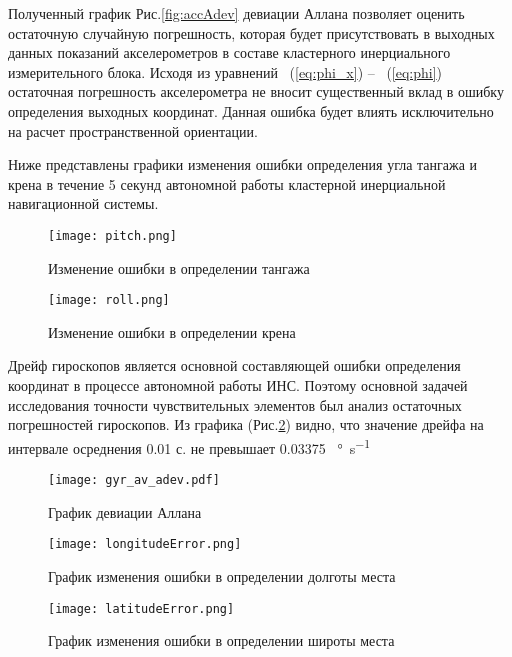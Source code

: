 Полученный график Рис.\ref{fig:accAdev} девиации Аллана позволяет оценить остаточную случайную погрешность, которая будет присутствовать в выходных данных показаний акселерометров в составе кластерного инерциального измерительного блока. Исходя из уравнений ~(\ref{eq:phi_x}) -- ~(\ref{eq:phi}) остаточная погрешность акселерометра не вносит существенный вклад в ошибку определения выходных координат. Данная ошибка будет влиять исключительно на расчет пространственной ориентации.  


Ниже представлены графики изменения ошибки определения угла тангажа и крена в течение 5 секунд автономной работы кластерной инерциальной навигационной системы. 

\newpage

\begin{figure}[h!]
	\centering
	\texttt{[image: pitch.png]}
	\caption{Изменение ошибки в определении тангажа}
	\label{fig:pitch}
	
	\vspace*{\floatsep}
	
	\texttt{[image: roll.png]}
	\caption{Изменение ошибки в определении крена}
	\label{fig:roll}
	
\end{figure}

\newpage
Дрейф гироскопов является основной составляющей ошибки определения координат в процессе автономной работы ИНС. Поэтому основной задачей исследования точности чувствительных элементов был анализ остаточных погрешностей гироскопов. Из графика (Рис.\ref{fig:mpr}) видно, что значение дрейфа на интервале осреднения 0.01 с. не превышает 0.03375 \SI[per-mode=symbol]{}{\degree\per\second}


\begin{figure}[h!]
	\centering
	\texttt{[image: gyr\_av\_adev.pdf]}
	\caption{График девиации Аллана}
	\label{fig:mpr}
\end{figure}

\newpage

\begin{figure}[h!]
	
	\centering
	\texttt{[image: longitudeError.png]}
	\caption{График изменения ошибки в определении долготы места}
	\label{fig:long_error}

	\vspace*{\floatsep}
	
	\texttt{[image: latitudeError.png]}
	\caption{График изменения ошибки в определении широты места}
	\label{fig:lat_error}
\end{figure}
\newpage
